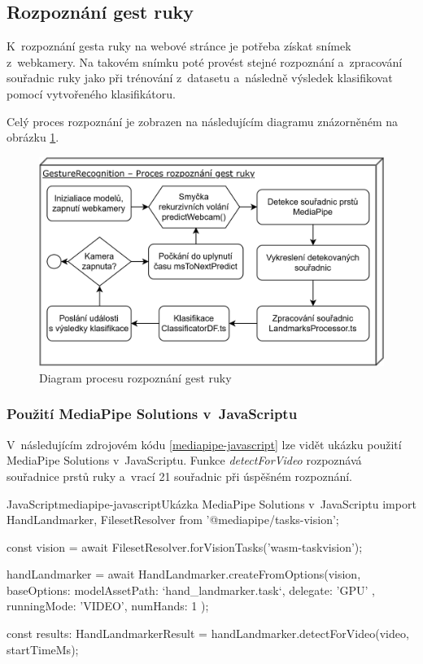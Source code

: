 \documentclass[
  master,
  program=ainfvs,
  biblatex,
  figures=true,
  tables=false,
  sourcecodes=true,
  glossaries,
  index
]{kidiplom}
\begin{document}
    
    \subsection{Rozpoznání gest ruky}
        K~rozpoznání gesta ruky na webové stránce je potřeba získat snímek z~webkamery. Na takovém snímku poté provést stejné rozpoznání a~zpracování souřadnic ruky jako při trénování z~datasetu a~následně výsledek klasifikovat pomocí vytvořeného klasifikátoru. 
        
        Celý proces rozpoznání je zobrazen na následujícím diagramu znázorněném na obrázku \ref{gesture-recognition-diagram}.

        \begin{figure}[htbp]
            \centering
            \includegraphics[width=0.8\columnwidth]{graphics/gesture-recognition-diagram.png}
            \caption{Diagram procesu rozpoznání gest ruky}
            \label{gesture-recognition-diagram}
        \end{figure}
        
    
        \subsubsection{Použití MediaPipe Solutions v~JavaScriptu}

            V~následujícím zdrojovém kódu \ref{mediapipe-javascript} lze vidět ukázku použití MediaPipe Solutions v~JavaScriptu. Funkce \emph{detectForVideo} rozpoznává souřadnice prstů ruky a~vrací 21 souřadnic při úspěšném rozpoznání.

        \begin{kicode}{JavaScript}{mediapipe-javascript}{Ukázka MediaPipe Solutions v~JavaScriptu}
import {HandLandmarker, FilesetResolver} from '@mediapipe/tasks-vision';

const vision = await FilesetResolver.forVisionTasks('wasm-taskvision');

handLandmarker = await HandLandmarker.createFromOptions(vision, {
    baseOptions: {
        modelAssetPath: `hand_landmarker.task`,
        delegate: 'GPU'
    },
    runningMode: 'VIDEO',
    numHands: 1
});

const results: HandLandmarkerResult = handLandmarker.detectForVideo(video, startTimeMs);
        \end{kicode}
        
\end{document}
